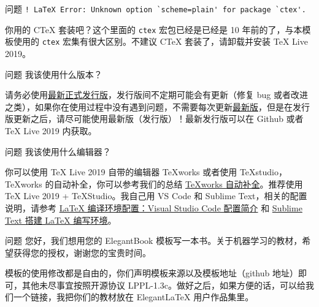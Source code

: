 \documentclass[cn,11pt]{elegantbook}
\begin{document}
\begin{custom}{问题}
\lstinline{! LaTeX Error: Unknown option `scheme=plain' for package `ctex'.}
\end{custom}

\begin{solution}
你用的 C\TeX{} 套装吧？这个里面的 \lstinline{ctex} 宏包已经是已经是 10 年前的了，与本模板使用的 \lstinline{ctex} 宏集有很大区别。不建议 C\TeX{} 套装了，请卸载并安装 \TeX{} Live 2019。
\end{solution}

\begin{custom}{问题}
我该使用什么版本？
\end{custom}

\begin{solution}
请务必使用\href{https://github.com/ElegantLaTeX/ElegantBook/releases}{最新正式发行版}，发行版间不定期可能会有更新（修复 bug 或者改进之类），如果你在使用过程中没有遇到问题，不需要每次更新\href{https://github.com/ElegantLaTeX/ElegantBook/archive/master.zip}{最新版}，但是在发行版更新之后，请尽可能使用最新版（发行版）！最新发行版可以在 Github 或者 \TeX{} Live 2019 内获取。
\end{solution}


\begin{custom}{问题}
我该使用什么编辑器？
\end{custom}

\begin{solution}
你可以使用 \TeX{} Live 2019 自带的编辑器 \TeX{}works 或者使用 \TeX{}studio，\TeX works 的自动补全，你可以参考我们的总结 \href{https://github.com/EthanDeng/texworks-autocomplete}{\TeX works 自动补全}。推荐使用 \TeX{} Live 2019 + \TeX Studio。我自己用 VS Code 和 Sublime Text，相关的配置说明，请参考 \href{https://github.com/EthanDeng/vscode-latex}{\LaTeX{} 编译环境配置：Visual Studio Code 配置简介} 和 \href{https://github.com/EthanDeng/sublime-text-latex}{Sublime Text 搭建 \LaTeX{} 编写环境}。
\end{solution}


\begin{custom}{问题}
您好，我们想用您的 ElegantBook 模板写一本书。关于机器学习的教材，希望获得您的授权，谢谢您的宝贵时间。
\end{custom}

\begin{solution}
模板的使用修改都是自由的，你们声明模板来源以及模板地址（github 地址）即可，其他未尽事宜按照开源协议 LPPL-1.3c。做好之后，如果方便的话，可以给我们一个链接，我把你们的教材放在 ElegantLaTeX 用户作品集里。
\end{solution}
\end{document}

